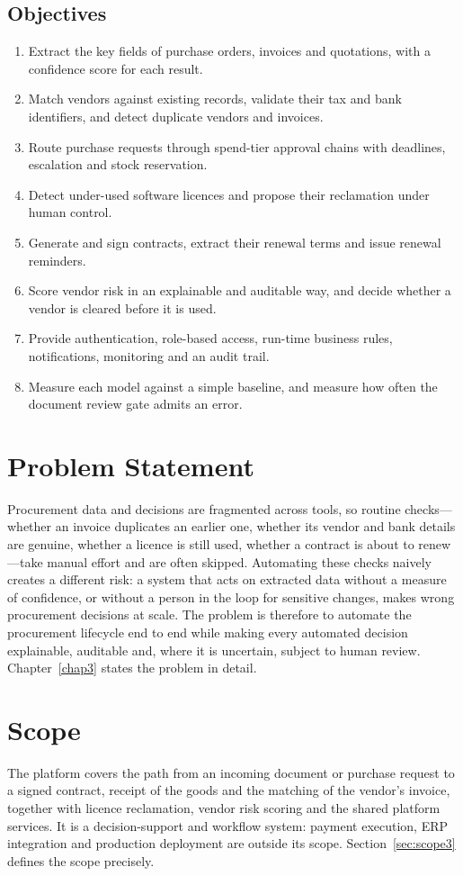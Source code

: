 \subsection{Objectives}
\begin{enumerate}
  \item Extract the key fields of purchase orders, invoices and quotations, with a confidence score for each result.
  \item Match vendors against existing records, validate their tax and bank identifiers, and detect duplicate vendors and invoices.
  \item Route purchase requests through spend-tier approval chains with deadlines, escalation and stock reservation.
  \item Detect under-used software licences and propose their reclamation under human control.
  \item Generate and sign contracts, extract their renewal terms and issue renewal reminders.
  \item Score vendor risk in an explainable and auditable way, and decide whether a vendor is cleared before it is used.
  \item Provide authentication, role-based access, run-time business rules, notifications, monitoring and an audit trail.
  \item Measure each model against a simple baseline, and measure how often the document review gate admits an error.
\end{enumerate}

\section{Problem Statement}
Procurement data and decisions are fragmented across tools, so routine checks---whether an invoice duplicates an earlier one, whether its vendor and bank details are genuine, whether a licence is still used, whether a contract is about to renew---take manual effort and are often skipped. Automating these checks naively creates a different risk: a system that acts on extracted data without a measure of confidence, or without a person in the loop for sensitive changes, makes wrong procurement decisions at scale. The problem is therefore to automate the procurement lifecycle end to end while making every automated decision explainable, auditable and, where it is uncertain, subject to human review. Chapter~\ref{chap3} states the problem in detail.

\section{Scope}
The platform covers the path from an incoming document or purchase request to a signed contract, receipt of the goods and the matching of the vendor's invoice, together with licence reclamation, vendor risk scoring and the shared platform services. It is a decision-support and workflow system: payment execution, ERP integration and production deployment are outside its scope. Section~\ref{sec:scope3} defines the scope precisely.


